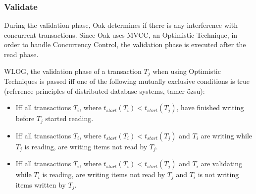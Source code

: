 \documentclass[abstracton,12pt]{scrreprt}
\newtheorem{example}{Example}
\begin{document}
\subsubsection{Validate}

During the validation phase, Oak determines if there is any interference with concurrent transactions.
Since Oak uses MVCC, an Optimistic Technique, in order to handle Concurrency Control, the validation phase is executed after the read phase.

WLOG, the validation phase of a transaction $T_j$ when using Optimistic Techniques is passed iff one of the following mutually exclusive conditions is true (reference principles of distributed database systems, tamer özsu):

\begin{itemize}
    \item Iff all transactions $T_i$, where $t_{start}(T_i) < t_{start}(T_j)$, have finished writing before $T_j$ started reading.
    \item Iff all transactions $T_i$, where $t_{start}(T_i) < t_{start}(T_j)$ and $T_i$ are writing while $T_j$ is reading, are writing items not read by $T_j$.
    \item Iff all transactions $T_i$, where $t_{start}(T_i) < t_{start}(T_j)$ and $T_i$ are validating while $T_i$ is reading, are writing items not read by $T_j$ and $T_i$ is not writing items written by $T_j$.
\end{itemize}





\end{document}
